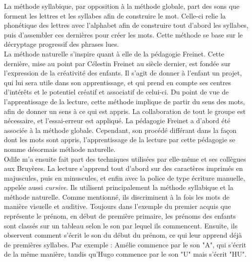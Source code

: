 La méthode syllabique, par opposition à la méthode globale, part des sons que forment les lettres et les syllabes afin de construire le mot. Celle-ci relie la phonétique des lettres avec l'alphabet afin de construire tout d'abord les syllabes, puis d'assembler ces dernières pour créer les mots. Cette méthode se base sur le décryptage progressif des phrases lues.\\

La méthode naturelle s'inspire quant à elle de la pédagogie Freinet. Cette dernière, mise au point par Célestin Freinet au siècle dernier, est fondée sur l'expression de la créativité des enfants. Il s'agit de donner à l'enfant un projet, qui lui sera utile dans son apprentissage, et qui prend en compte ses centres d'intérêts et le potentiel créatif et associatif de celui-ci. Du point de vue de l'apprentissage de la lecture, cette méthode implique de partir du sens des mots, afin de donner un sens à ce qui est appris. La collaboration de tout le groupe est nécessaire, et l'essai-erreur est appliqué. La pédagogie Freinet a d'abord été associée à la méthode globale. Cependant, son procédé différant dans la façon dont les mots sont appris, l'apprentissage de la lecture par cette pédagogie se nomme désormais méthode naturelle.\\

Odile m'a ensuite fait part des techniques utilisées par elle-même et ses collègues aux Bruyères. La lecture s'apprend tout d'abord sur des caractères imprimés en majuscules, puis en minuscules, et enfin avec la police de type écriture manuelle, appelée aussi \textit{cursive}. Ils utilisent principalement la méthode syllabique et la méthode naturelle. Comme mentionné, ils discriminent à la fois les mots de manière visuelle et auditive. Toujours dans l'exemple du premier acquis que représente le prénom, en début de première primaire, les prénoms des enfants sont classés sur un tableau selon le son par lequel ils commencent. Ensuite, ils observent comment s'écrit le son du début du prénom, ce qui leur apprend déjà de premières syllabes. Par exemple : Amélie commence par le son "A", qui s'écrit de la même manière, tandis qu'Hugo commence par le son "U" mais s'écrit "HU".\\

